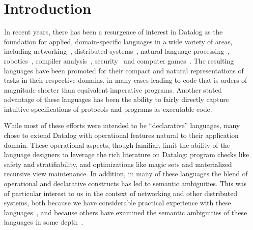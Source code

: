 \section{Introduction}




In recent years, there has been a resurgence of interest in Datalog as
the foundation for applied, domain-specific languages in a wide
variety of areas, including networking~\cite{Loo2009-CACM},
distributed systems~\cite{Belaramani:2009,Chu:2007}, natural language
processing~\cite{Eisner:2004}, robotics~\cite{Ashley-Rollman:2007},
compiler analysis~\cite{Lam:2005}, security~\cite{Li:2003,Zhou:2009}
and computer games~\cite{White:2007}.  The resulting languages have
been promoted for their compact and natural representations of tasks
in their respective domains, in many cases leading to code that is
orders of magnitude shorter than equivalent imperative programs.
Another stated advantage of these languages has been the ability to
fairly directly capture intuitive specifications of protocols and
programs as executable code.

While most of these efforts were intended to be ``declarative''
languages, many chose to extend Datalog with operational features
natural to their application domain.  These operational aspects,
though familiar, limit the ability of the language designers to
leverage the rich literature on Datalog: program checks like safety
and stratifiability, and optimizations like magic sets and
materialized recursive view maintenance.  In addition, in many of
these languages the blend of operational and declarative constructs
has led to semantic ambiguities.  This was of particular interest to
us in the context of networking and other distributed systems, both
because we have considerable practical experience with these
languages~\cite{Loo2009-CACM,boom-techr}, and because others have
examined the semantic ambiguities of these languages in some
depth~\cite{navarro,Mao2009}.

